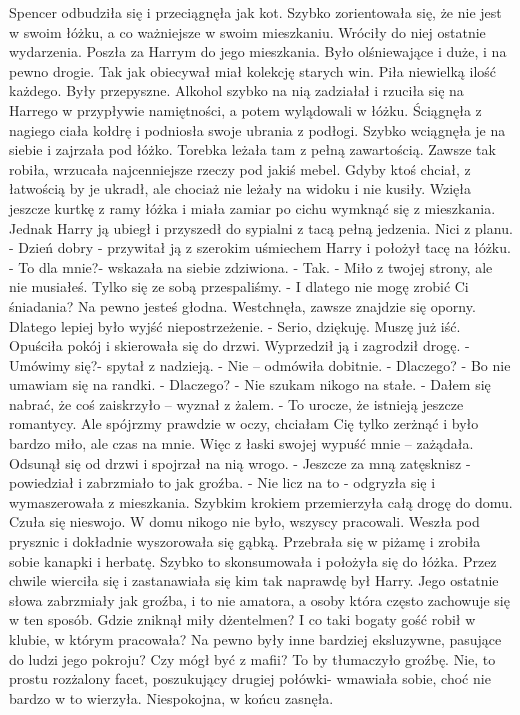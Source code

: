 \documentclass[12pt,a4paper]{book}
\begin{document}
Spencer odbudziła się i przeciągnęła jak kot. Szybko zorientowała się, że nie jest w swoim łóżku, a co ważniejsze w swoim mieszkaniu. Wróciły do niej ostatnie wydarzenia. Poszła za Harrym do jego mieszkania. Było olśniewające i duże, i na pewno drogie. Tak jak obiecywał miał kolekcję starych win. Piła niewielką ilość każdego. Były przepyszne. Alkohol szybko na nią zadziałał i rzuciła się na Harrego w przypływie namiętności, a potem wylądowali w łóżku. 
Ściągnęła z nagiego ciała kołdrę i podniosła swoje ubrania z podłogi. Szybko wciągnęła je na siebie i zajrzała pod łóżko. Torebka leżała tam z pełną zawartością. Zawsze tak robiła, wrzucała najcenniejsze rzeczy pod jakiś mebel. Gdyby ktoś chciał, z łatwością by je ukradł, ale chociaż nie leżały na widoku i nie kusiły. Wzięła jeszcze kurtkę z ramy łóżka i miała zamiar po cichu wymknąć się z mieszkania. Jednak Harry ją ubiegł i przyszedł do sypialni z tacą pełną jedzenia. Nici z planu.
- Dzień dobry - przywitał ją z szerokim uśmiechem Harry i położył tacę na łóżku.
- To dla mnie?- wskazała na siebie zdziwiona. 
- Tak. 
- Miło z twojej strony, ale nie musiałeś. Tylko się ze sobą przespaliśmy. 
- I dlatego nie mogę zrobić Ci śniadania? Na pewno jesteś głodna. 
Westchnęła, zawsze znajdzie się oporny. Dlatego lepiej było wyjść niepostrzeżenie.
- Serio, dziękuję. Muszę już iść. 
Opuściła pokój i skierowała się do drzwi. Wyprzedził ją i zagrodził drogę. 
- Umówimy się?- spytał z nadzieją.
- Nie – odmówiła dobitnie.
- Dlaczego?
- Bo nie umawiam się na randki.
- Dlaczego?
- Nie szukam nikogo na stałe. 
- Dałem się nabrać, że coś zaiskrzyło – wyznał z żalem.
- To urocze, że istnieją jeszcze romantycy. Ale spójrzmy prawdzie w oczy, chciałam Cię tylko zerżnąć i było bardzo miło, ale czas na mnie. Więc z łaski swojej wypuść mnie – zażądała.
Odsunął się od drzwi i spojrzał na nią wrogo.
- Jeszcze za mną zatęsknisz - powiedział i zabrzmiało to jak groźba.
- Nie licz na to - odgryzła się i wymaszerowała z mieszkania. 
Szybkim krokiem przemierzyła całą drogę do domu. Czuła się nieswojo. W domu nikogo nie było, wszyscy pracowali. Weszła pod prysznic i dokładnie wyszorowała się gąbką. Przebrała się w piżamę i zrobiła sobie kanapki i herbatę. Szybko to skonsumowała i położyła się do łóżka.
Przez chwile wierciła się i zastanawiała się kim tak naprawdę był Harry. Jego ostatnie słowa zabrzmiały jak groźba, i to nie amatora, a osoby która często zachowuje się w ten sposób. Gdzie zniknął miły dżentelmen? I co taki bogaty gość robił w klubie, w którym pracowała? Na pewno były inne bardziej eksluzywne, pasujące do ludzi jego pokroju? Czy mógł być z mafii? To by tłumaczyło groźbę. 
Nie, to prostu rozżalony facet, poszukujący drugiej połówki- wmawiała sobie, choć nie bardzo w to wierzyła. 
Niespokojna, w końcu zasnęła.
\end{document}
